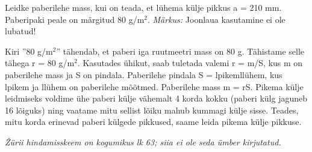 
Leidke paberilehe mass, kui on teada, et lühema külje pikkus a = 210 mm. Paberipaki peale on märgitud 80 g/m$^2$.
\textit{Märkus:} Joonlaua kasutamine ei ole lubatud!

\hint

\solu
Kiri ''80 g/m$^2$'' tähendab, et paberi iga ruutmeetri mass on 80 g. Tähistame selle tähega r = 80 g/m$^2$. Kasutades ühikut, saab tuletada valemi r = m/S, kus m on paberilehe mass ja S on pindala. Paberilehe pindala S = lpikemllühem, kus lpikem ja llühem on paberilehe mõõtmed. Paberilehe mass m = rS. Pikema külje leidmiseks voldime ühe paberi külje vähemalt 4 korda kokku (paberi külg jaguneb 16 lõiguks) ning vaatame mitu sellist lõiku mahub kummagi külje sisse. Teades, mitu korda erinevad paberi külgede pikkused, saame leida pikema külje pikkuse.

\textit{Žürii hindamisskeem on kogumikus lk 63; siia ei ole seda ümber kirjutatud.}
\probend
